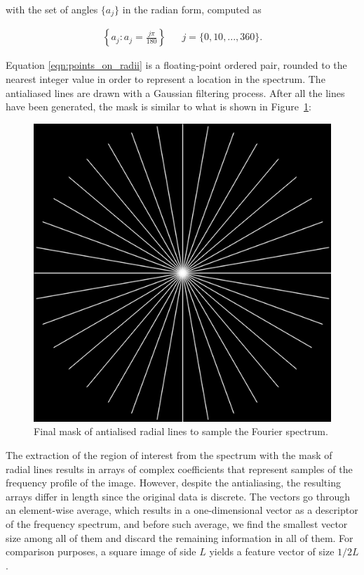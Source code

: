 \noindent with the set of angles $\{a_{j}\}$ in the radian form, computed as

\begin{align}
\label{eqn:angles}
\left\{
a_{j} : a_{j} = 
\frac{j \pi}{180}
\right\}
&&  j = \{0,10,...,360\}.
\end{align}

Equation
\ref{eqn:points_on_radii} is a
floating-point ordered pair, rounded to the nearest integer value in order to represent a location in the spectrum. The
antialiased lines are drawn with a Gaussian filtering process. After all the lines have been generated, the mask is similar to what is shown in Figure~\ref{fig:radial_masks}:

\begin{figure}[htb]
	\centering
	\caption{Final mask of antialised radial lines to sample the Fourier spectrum.}
	\label{fig:radial_masks}
	\includegraphics[scale=0.8]{images/radial_masks.png}
	\centering
	\fautor
\end{figure}

The extraction of the region of interest from the spectrum with the mask of radial lines results in arrays of complex coefficients that represent samples of the frequency profile of the image. However, despite the antialiasing, the resulting arrays differ in length since the original data is discrete. The vectors go through an element-wise average, which results in a one-dimensional vector as a descriptor of the frequency spectrum, and before such average, we find the smallest vector size among all of them and discard the remaining information in all of them. For comparison purposes, a square image of side $L$ yields a feature vector of size $1 / 2L$.

